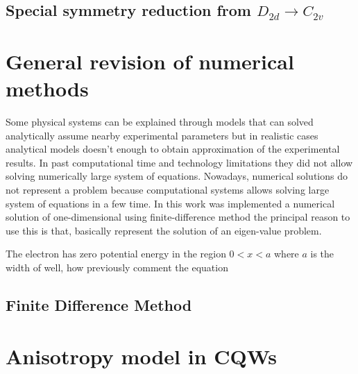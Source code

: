 \subsection{Special symmetry reduction from $D_{2d}\to C_{2v}$}
\label{subsubsec:chapter-2-symmetry-from-2d2-to-c2v}
\vspace{-10mm} 










\newpage
\section{General revision of numerical methods}
Some physical systems can be explained through models that can solved analytically assume nearby experimental parameters but in realistic cases analytical models doesn't enough to obtain approximation of the experimental results. In past computational time and technology limitations they did not allow solving numerically large system of equations.  Nowadays, numerical solutions do not represent a problem because computational systems  allows solving large system of equations in  
a few time. In this work was implemented  a numerical solution of one-dimensional \sch using finite-difference method the principal reason to use this is that, basically represent the solution of an eigen-value problem. 






The electron has zero potential energy in the region $0<x<a$ where $a$ is the width of well, how previously comment the \sch equation 



\subsection{Finite Difference Method}






\section{Anisotropy model in CQWs \label{sub:chap2-anisotropy-model}}

